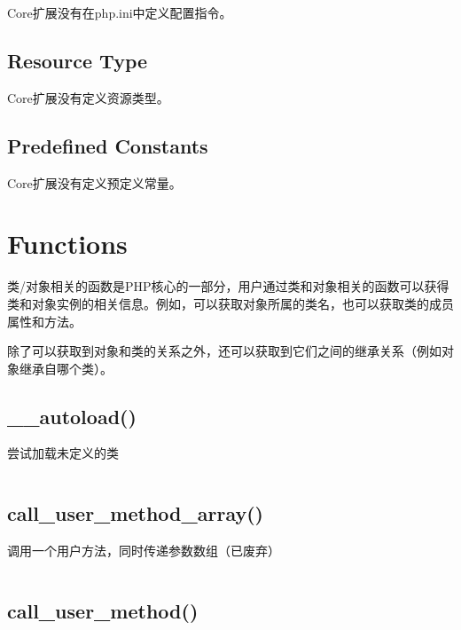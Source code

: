 Core扩展没有在php.ini中定义配置指令。


\section{Resource Type}

Core扩展没有定义资源类型。


\section{Predefined Constants}

Core扩展没有定义预定义常量。




\chapter{Functions}

类/对象相关的函数是PHP核心的一部分，用户通过类和对象相关的函数可以获得类和对象实例的相关信息。例如，可以获取对象所属的类名，也可以获取类的成员属性和方法。

除了可以获取到对象和类的关系之外，还可以获取到它们之间的继承关系（例如对象继承自哪个类）。



\section{\_\_autoload()}




尝试加载未定义的类



\begin{lstlisting}[language=PHP]

\end{lstlisting}


\section{call\_user\_method\_array()}

调用一个用户方法，同时传递参数数组（已废弃）


\begin{lstlisting}[language=PHP]

\end{lstlisting}



\section{call\_user\_method()}

